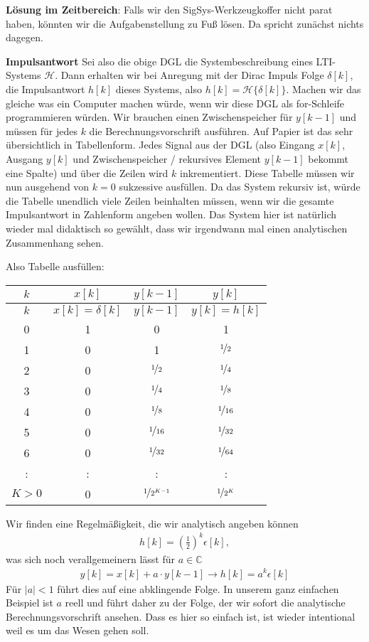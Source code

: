 \begin{Ansatz}
\textbf{Lösung im Zeitbereich}:
Falls wir den SigSys-Werkzeugkoffer nicht parat haben, könnten wir die
Aufgabenstellung zu Fuß lösen. Da spricht zunächst nichts dagegen.

\textbf{Impulsantwort}
Sei also die obige DGL die Systembeschreibung eines LTI-Systems $\mathcal{H}$.
Dann erhalten wir bei Anregung mit der Dirac Impuls Folge $\delta[k]$, die Impulsantwort $h[k]$
dieses Systems, also $h[k] = \mathcal{H}\{\delta[k]\}$. Machen wir das gleiche
was ein Computer machen würde, wenn wir diese DGL als for-Schleife programmieren
würden. Wir brauchen einen Zwischenspeicher für $y[k-1]$ und müssen für jedes
$k$ die Berechnungsvorschrift ausführen. Auf Papier ist das sehr übersichtlich
in Tabellenform. Jedes Signal aus der DGL (also Eingang $x[k]$, Ausgang $y[k]$
und Zwischenspeicher / rekursives Element $y[k-1]$ bekommt eine Spalte) und
über die Zeilen wird $k$ inkrementiert. Diese Tabelle müssen wir nun ausgehend
von $k=0$ sukzessive ausfüllen. Da das System rekursiv ist, würde die Tabelle
unendlich viele Zeilen beinhalten müssen, wenn wir die gesamte Impulsantwort
in Zahlenform angeben wollen. Das System hier ist natürlich wieder mal didaktisch
so gewählt, dass wir irgendwann mal einen analytischen Zusammenhang sehen.

Also Tabelle ausfüllen:
\begin{center}
\begin{tabular}{||c | c | c | c||}
\hline
$k$ & $x[k]$ & $y[k-1]$ & $y[k]$ \\
\hline\hline
$k$ & $x[k]=\delta[k]$ & $y[k-1]$ & $y[k] = h[k]$ \\
\hline
0 & 1 & 0 & 1  \\\hline
1 & 0 & 1  & $\nicefrac{1}{2}$ \\\hline
2 & 0 & $\nicefrac{1}{2}$ & $\nicefrac{1}{4}$ \\\hline
3 & 0 & $\nicefrac{1}{4}$ & $\nicefrac{1}{8}$ \\\hline
4 & 0 & $\nicefrac{1}{8}$ & $\nicefrac{1}{16}$ \\\hline
5 & 0 & $\nicefrac{1}{16}$ & $\nicefrac{1}{32}$ \\\hline
6 & 0 & $\nicefrac{1}{32}$ & $\nicefrac{1}{64}$ \\\hline
: & : & : & : \\\hline
$K > 0$ & 0 & $\nicefrac{1}{2^{K-1}}$ & $\nicefrac{1}{2^K}$ \\\hline
\end{tabular}
\end{center}
Wir finden eine Regelmäßigkeit, die wir analytisch angeben können
\begin{align}
h[k] = \left(\frac{1}{2}\right)^k \epsilon[k],
\end{align}
was sich noch verallgemeinern lässt für $a\in\mathbb{C}$
\begin{align}
y[k] = x[k] + a \cdot y[k-1] \rightarrow h[k] = a^k \epsilon[k]
\end{align}
Für $|a|<1$ führt dies auf eine abklingende Folge. In unserem ganz einfachen
Beispiel ist $a$ reell und führt daher zu der Folge, der wir sofort die
analytische Berechnungsvorschrift ansehen. Dass es hier so einfach ist, ist
wieder intentional weil es um das Wesen gehen soll.


\end{Ansatz}
